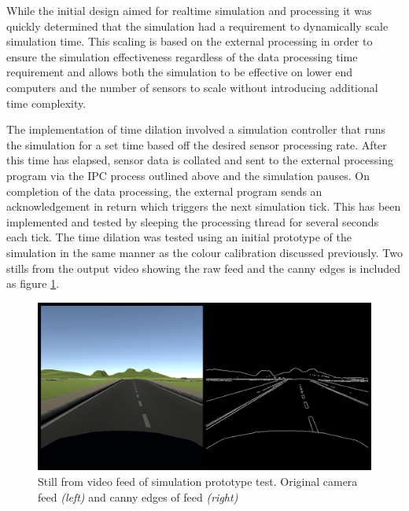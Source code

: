 \documentclass[]{aiaa-tc}%
\begin{document}
While the initial design aimed for realtime simulation and processing it was quickly determined that the simulation had a requirement to dynamically scale simulation time. This scaling is based on the external processing in order to ensure the simulation effectiveness regardless of the data processing time requirement and allows both the simulation to be effective on lower end computers and the number of sensors to scale without introducing additional time complexity.

The implementation of time dilation involved a simulation controller that runs the simulation for a set time based off the desired sensor processing rate. After this time has elapsed, sensor data is collated and sent to the external processing program via the IPC process outlined above and the simulation pauses. On completion of the data processing, the external program sends an acknowledgement in return which triggers the next simulation tick. This has been implemented and tested by sleeping the processing thread for several seconds each tick. The time dilation was tested using an initial prototype of the simulation in the same manner as the colour calibration discussed previously. Two stills from the output video showing the raw feed and the canny edges is included as figure \ref{f:simPrototypeIPCTest}.


\begin{figure}[htb]%
 \includegraphics{simPrototypeIPC.png}
 \caption{Still from video feed of simulation prototype test. Original camera feed \textit{(left)} and canny edges of feed \textit{(right)}}
 \label{f:simPrototypeIPCTest}
\end{figure}
\end{document}
